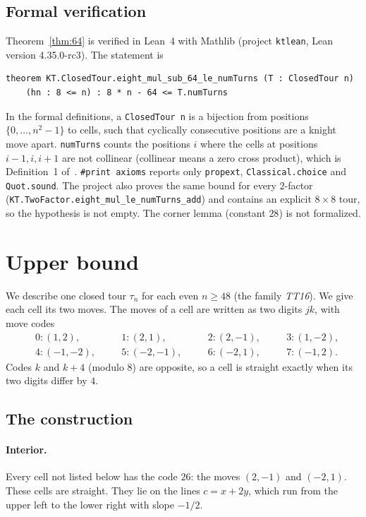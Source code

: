 \documentclass[11pt]{article}
\theoremstyle{definition}
\theoremstyle{remark}
\begin{document}
\subsection{Formal verification}\label{sec:lean}

Theorem~\ref{thm:64} is verified in Lean~4 with Mathlib (project \texttt{ktlean}, Lean version 4.35.0-rc3).
The statement is
\begin{verbatim}
theorem KT.ClosedTour.eight_mul_sub_64_le_numTurns (T : ClosedTour n)
    (hn : 8 <= n) : 8 * n - 64 <= T.numTurns
\end{verbatim}
In the formal definitions, a \texttt{ClosedTour n} is a bijection from positions $\{0,\dots,n^2-1\}$ to cells, such that cyclically consecutive positions are a knight move apart.
\texttt{numTurns} counts the positions $i$ where the cells at positions $i-1,i,i+1$ are not collinear (collinear means a zero cross product), which is Definition~1 of~\cite{bjmow}.
\texttt{\#print axioms} reports only \texttt{propext}, \texttt{Classical.choice} and \texttt{Quot.sound}.
The project also proves the same bound for every $2$-factor (\texttt{KT.TwoFactor.eight\_mul\_le\_numTurns\_add}) and contains an explicit $8\times8$ tour, so the hypothesis is not empty.
The corner lemma (constant $28$) is not formalized.

\section{Upper bound}\label{sec:upper}

We describe one closed tour $\tau_n$ for each even $n\ge48$ (the family \emph{TT16}).
We give each cell its two moves.
The moves of a cell are written as two digits $jk$, with move codes
\begin{align*}
&0:(1,2),\quad &&1:(2,1),\quad &&2:(2,-1),\quad &&3:(1,-2),\\
&4:(-1,-2),\quad &&5:(-2,-1),\quad &&6:(-2,1),\quad &&7:(-1,2).
\end{align*}
Codes $k$ and $k+4$ (modulo $8$) are opposite, so a cell is straight exactly when its two digits differ by $4$.

\subsection{The construction}

\paragraph{Interior.}
Every cell not listed below has the code $26$: the moves $(2,-1)$ and $(-2,1)$.
These cells are straight.
They lie on the lines $c=x+2y$, which run from the upper left to the lower right with slope $-1/2$.
\end{document}
